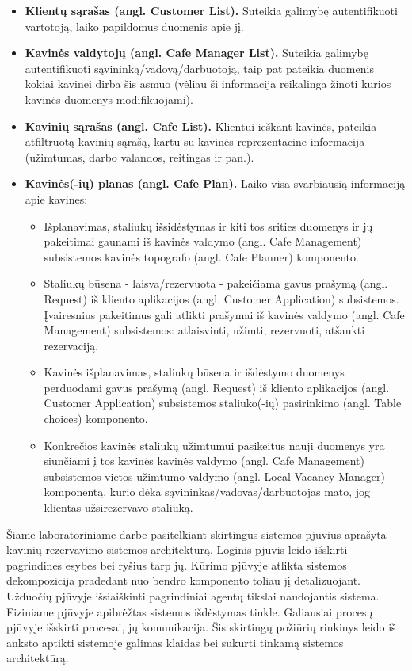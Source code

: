 \documentclass{VUMIFPSkursinis}
\begin{document}
\begin{itemize}
  \item \textbf{Klientų sąrašas (angl. Customer List).} Suteikia galimybę autentifikuoti vartotoją, laiko papildomus duomenis apie jį.
  \item \textbf{Kavinės valdytojų (angl. Cafe Manager List).} Suteikia galimybę autentifikuoti sąvininką/vadovą/darbuotoją, taip pat pateikia duomenis kokiai kavinei dirba šis asmuo (vėliau ši informacija reikalinga žinoti kurios kavinės duomenys modifikuojami).
  \item \textbf{Kavinių sąrašas (angl. Cafe List).} Klientui ieškant kavinės, pateikia atfiltruotą kavinių sąrašą, kartu su kavinės reprezentacine informacija (užimtumas, darbo valandos, reitingas ir pan.).
  \item \textbf{Kavinės(-ių) planas (angl. Cafe Plan).} Laiko visa svarbiausią informaciją apie kavines:
  	\begin{itemize}
  	\item Išplanavimas, staliukų išsidėstymas ir kiti tos srities duomenys ir jų pakeitimai gaunami iš kavinės valdymo (angl. Cafe Management) subsistemos kavinės topografo (angl. Cafe Planner) komponento.
  	\item Staliukų būsena - laisva/rezervuota - pakeičiama gavus prašymą (angl. Request) iš kliento aplikacijos (angl. Customer Application) subsistemos. Įvairesnius pakeitimus gali atlikti prašymai iš kavinės valdymo (angl. Cafe Management) subsistemos: atlaisvinti, užimti, rezervuoti, atšaukti rezervaciją.
  	\item Kavinės išplanavimas, staliukų būsena ir išdėstymo duomenys perduodami gavus prašymą (angl. Request) iš kliento aplikacijos (angl. Customer Application) subsistemos staliuko(-ių) pasirinkimo (angl. Table choices) komponento.
  	\item Konkrečios kavinės staliukų užimtumui pasikeitus nauji duomenys yra siunčiami į tos kavinės kavinės valdymo (angl. Cafe Management) subsistemos vietos užimtumo valdymo (angl. Local Vacancy Manager) komponentą, kurio dėka sąvininkas/vadovas/darbuotojas mato, jog klientas užsirezervavo staliuką.
  	\end{itemize}
\end{itemize}


Šiame laboratoriniame darbe pasitelkiant skirtingus sistemos pjūvius aprašyta kavinių rezervavimo sistemos architektūrą. Loginis pjūvis leido išskirti pagrindines esybes bei ryšius tarp jų. Kūrimo pjūvyje atlikta sistemos dekompozicija pradedant nuo bendro komponento toliau jį detalizuojant. Užduočių pjūvyje išsiaiškinti pagrindiniai agentų tikslai naudojantis sistema. Fiziniame pjūvyje apibrėžtas sistemos išdėstymas tinkle.  Galiausiai procesų pjūvyje išskirti procesai, jų komunikacija. Šis skirtingų požiūrių rinkinys leido iš anksto aptikti sistemoje galimas klaidas bei sukurti tinkamą sistemos architektūrą.
\end{document}
